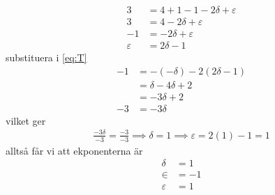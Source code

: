 \documentclass[a4paper,12pt]{article}
\begin{document}
\begin{align}
    3 &= 4 + 1 - 1 - 2\delta + \varepsilon \\
    3 &= 4 - 2\delta + \varepsilon \\
    -1 &= -2\delta + \varepsilon \\
    \varepsilon &= 2\delta - 1
\end{align}
substituera i \cref{eq:T}
\begin{align}
    -1 &= -(-\delta)-2(2\delta-1) \\
    &= \delta - 4\delta + 2 \\
    &= -3\delta + 2 \\
    -3 &= -3\delta
\end{align}
vilket ger
\begin{align}
    \frac{-3\delta}{-3} = \frac{-3}{-3} \implies \delta = 1 \implies \varepsilon = 2(1)-1 = 1
\end{align}
alltså får vi att ekponenterna är
\begin{align}
    \delta &= 1 \\
    \in &= -1 \\
    \varepsilon &= 1
\end{align}
\end{document}
